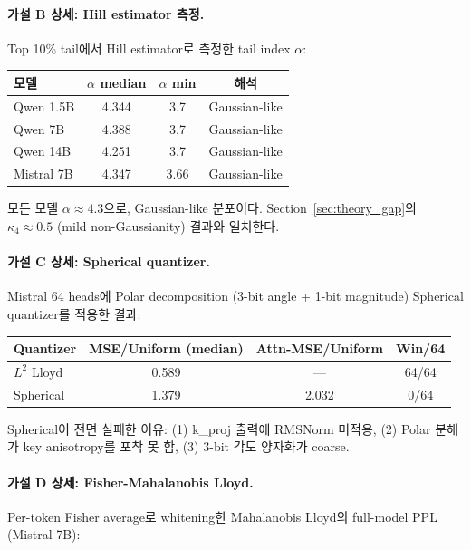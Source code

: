 \paragraph{가설 B 상세: Hill estimator 측정.}
Top 10\% tail에서 Hill estimator로 측정한 tail index $\alpha$:

\begin{center}
\small
\begin{tabular}{@{}lccc@{}}
\toprule
모델 & $\alpha$ median & $\alpha$ min & 해석 \\
\midrule
Qwen 1.5B & 4.344 & 3.7 & Gaussian-like \\
Qwen 7B & 4.388 & 3.7 & Gaussian-like \\
Qwen 14B & 4.251 & 3.7 & Gaussian-like \\
Mistral 7B & 4.347 & 3.66 & Gaussian-like \\
\bottomrule
\end{tabular}
\end{center}

모든 모델 $\alpha \approx 4.3$으로, Gaussian-like 분포이다. Section~\ref{sec:theory_gap}의 $\kappa_4 \approx 0.5$ (mild non-Gaussianity) 결과와 일치한다.

\paragraph{가설 C 상세: Spherical quantizer.}
Mistral 64 heads에 Polar decomposition (3-bit angle + 1-bit magnitude) Spherical quantizer를 적용한 결과:

\begin{center}
\small
\begin{tabular}{@{}lccc@{}}
\toprule
Quantizer & MSE/Uniform (median) & Attn-MSE/Uniform & Win/64 \\
\midrule
$L^2$ Lloyd & 0.589 & --- & 64/64 \\
Spherical & 1.379 & 2.032 & 0/64 \\
\bottomrule
\end{tabular}
\end{center}

Spherical이 전면 실패한 이유: (1) k\_proj 출력에 RMSNorm 미적용, (2) Polar 분해가 key anisotropy를 포착 못 함, (3) 3-bit 각도 양자화가 coarse.

\paragraph{가설 D 상세: Fisher-Mahalanobis Lloyd.}
Per-token Fisher average로 whitening한 Mahalanobis Lloyd의 full-model PPL (Mistral-7B):

